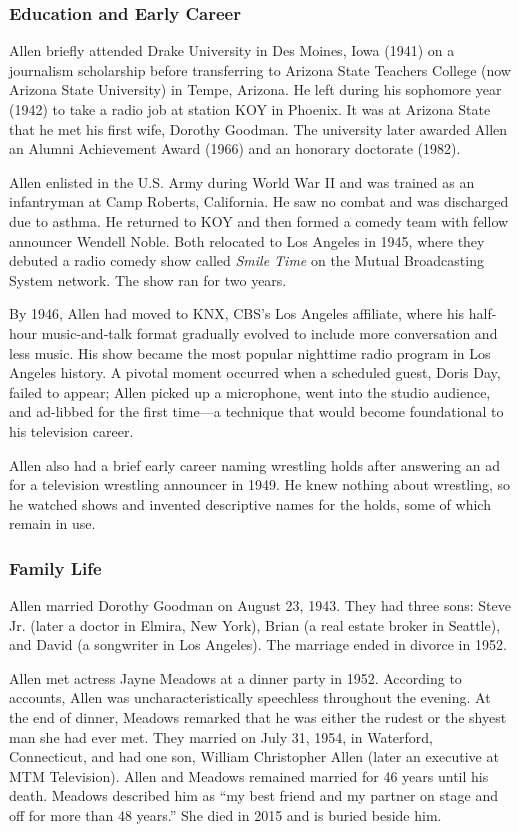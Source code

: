 \documentclass[11pt,letterpaper]{article}
\begin{document}
\subsubsection{Education and Early Career}

Allen briefly attended Drake University in Des Moines, Iowa (1941) on a journalism scholarship before transferring to Arizona State Teachers College (now Arizona State University) in Tempe, Arizona. He left during his sophomore year (1942) to take a radio job at station KOY in Phoenix. It was at Arizona State that he met his first wife, Dorothy Goodman. The university later awarded Allen an Alumni Achievement Award (1966) and an honorary doctorate (1982).

Allen enlisted in the U.S. Army during World War II and was trained as an infantryman at Camp Roberts, California. He saw no combat and was discharged due to asthma. He returned to KOY and then formed a comedy team with fellow announcer Wendell Noble. Both relocated to Los Angeles in 1945, where they debuted a radio comedy show called \textit{Smile Time} on the Mutual Broadcasting System network. The show ran for two years.

By 1946, Allen had moved to KNX, CBS's Los Angeles affiliate, where his half-hour music-and-talk format gradually evolved to include more conversation and less music. His show became the most popular nighttime radio program in Los Angeles history. A pivotal moment occurred when a scheduled guest, Doris Day, failed to appear; Allen picked up a microphone, went into the studio audience, and ad-libbed for the first time---a technique that would become foundational to his television career.

Allen also had a brief early career naming wrestling holds after answering an ad for a television wrestling announcer in 1949. He knew nothing about wrestling, so he watched shows and invented descriptive names for the holds, some of which remain in use.

\subsubsection{Family Life}

Allen married Dorothy Goodman on August 23, 1943. They had three sons: Steve Jr. (later a doctor in Elmira, New York), Brian (a real estate broker in Seattle), and David (a songwriter in Los Angeles). The marriage ended in divorce in 1952.

Allen met actress Jayne Meadows at a dinner party in 1952. According to accounts, Allen was uncharacteristically speechless throughout the evening. At the end of dinner, Meadows remarked that he was either the rudest or the shyest man she had ever met. They married on July 31, 1954, in Waterford, Connecticut, and had one son, William Christopher Allen (later an executive at MTM Television). Allen and Meadows remained married for 46 years until his death. Meadows described him as ``my best friend and my partner on stage and off for more than 48 years.'' She died in 2015 and is buried beside him.
\end{document}

